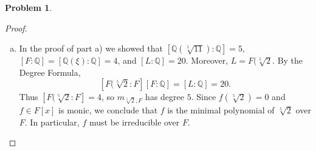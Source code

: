 \documentclass[11pt]{article}
\newcommand{\Q}{\mathbb{Q}}
\theoremstyle{definition}
\newtheorem{problem}{Problem}
\begin{document}
\begin{problem}
\begin{proof}
\begin{enumerate}[a)]
\item In the proof of part a) we showed that $[\Q(\sqrt[5]{11}) : \Q] = 5$, $[F : \Q] = [\Q(\xi) : \Q] = 4$, and $[L : \Q] = 20$. Moreover, $L = F(\sqrt[5]{2}$. By the Degree Formula,
$$[F(\sqrt[5]{2} : F] [F : \Q] = [L : \Q] = 20.$$
Thus $[F(\sqrt[5]{2} : F] = 4$, so $m_{\sqrt[5]{2},F}$ has degree $5$. Since $f(\sqrt[5]{2}) = 0$ and $f \in F[x]$ is monic, we conclude that $f$ is the minimal polynomial of $\sqrt[5]{2}$ over $F$. In particular, $f$ must be irreducible over $F$.\qedhere
\end{enumerate}	
\end{proof}

\end{problem}
\end{document}
